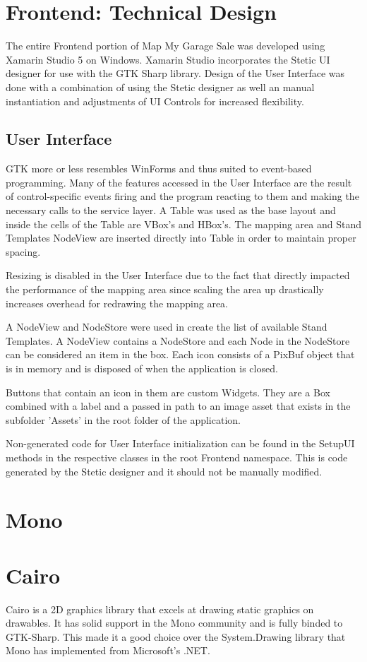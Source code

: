\documentclass{report}
\begin{document}
\section{Frontend: Technical Design}
The entire Frontend portion of Map My Garage Sale was developed using Xamarin
Studio 5 on Windows. Xamarin Studio incorporates the Stetic UI designer for use with the GTK
Sharp library. Design of the User Interface was done with a combination of using the 
Stetic designer as well an manual instantiation and adjustments of UI Controls for 
increased flexibility. 
\subsection{User Interface}
GTK more or less resembles WinForms and thus suited to event-based programming.
Many of the features accessed in the User Interface are the result of control-specific 
events firing and the program reacting to them and making the necessary calls to the 
service layer. A Table was used as the base layout and inside the cells of the Table are 
VBox's and HBox's. The mapping area and Stand Templates NodeView are inserted
directly into Table in order to maintain proper spacing. 

Resizing is disabled in the User Interface due to the fact that directly impacted the 
performance of the mapping area since scaling the area up drastically increases 
overhead for redrawing the mapping area.

A NodeView and NodeStore were used in create the list of available Stand Templates.
A NodeView contains a NodeStore and each Node in the NodeStore can be considered 
an item in the box. Each icon consists of a PixBuf object that is in memory and is
disposed of when the application is closed.

Buttons that contain an icon in them are custom Widgets. They are a Box combined with a label 
and a passed in path to an image asset that exists in the subfolder 'Assets' in the root
folder of the application.

Non-generated code for User Interface initialization can be found in the SetupUI 
methods in the respective classes in the root Frontend namespace. This is code 
generated by the Stetic designer and it should not be manually modified.

\section{Mono}
\section{Cairo}
Cairo is a 2D graphics library that excels at drawing static graphics on drawables. 
It has solid support in the Mono community and is fully binded to GTK-Sharp. This made 
it a good choice over the System.Drawing library that Mono has implemented from 
Microsoft's .NET.
\end{document}

